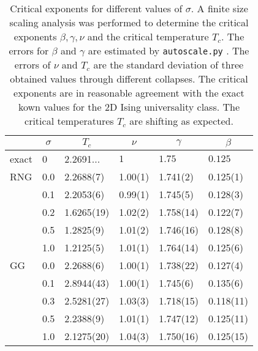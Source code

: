 \begin{table}[htb]
    \begin{ruledtabular}
        \begin{tabular}{l l l l l l}
             & \multicolumn{1}{c}{\(\sigma\)} & \multicolumn{1}{c}{\(T_c\)} & \multicolumn{1}{c}{\(\nu\)} & \multicolumn{1}{c}{\(\gamma\)} & \multicolumn{1}{c}{\(\beta\)}\\
            \hline
            exact        & 0   & 2.2691... & \(1\)    & \(1.75\) & \(0.125\)\\
            \hline
            RNG          & 0.0 & 2.2688(7) & 1.00(1) & 1.741(2) & 0.125(1) \\
                         & 0.1 & 2.2053(6) & 0.99(1) & 1.745(5) & 0.128(3) \\
                         & 0.2 & 1.6265(19)& 1.02(2) & 1.758(14)& 0.122(7)\\
                         & 0.5 & 1.2825(9) & 1.01(2) & 1.746(16)& 0.128(8)\\
                         & 1.0 & 1.2125(5) & 1.01(1) & 1.764(14)& 0.125(6)\\
            \hline
            GG           & 0.0 & 2.2688(6) & 1.00(1) & 1.738(22)& 0.127(4)\\
                         & 0.1 & 2.8944(43)& 1.00(1) & 1.745(6) & 0.135(6) \\
                         & 0.3 & 2.5281(27)& 1.03(3) & 1.718(15)& 0.118(11)\\
                         & 0.5 & 2.2388(9) & 1.01(1) & 1.747(12)& 0.125(11)\\
                         & 1.0 & 2.1275(20)& 1.04(3) & 1.750(16)& 0.125(15)\\
        \end{tabular}
    \end{ruledtabular}
    \caption[Critical Exponents for Different $\sigma$]{
        Critical exponents for different values of \(\sigma\). A finite size
        scaling analysis was performed to determine the critical
        exponents \(\beta, \gamma, \nu\) and the critical temperature
        \(T_c\). The errors for \(\beta\) and \(\gamma\) are estimated
        by \texttt{autoscale.py} \cite{autoscale2009}. The errors of
        \(\nu\) and \(T_c\) are the standard deviation of three obtained
        values through different collapses. The critical exponents
        are in reasonable agreement with the exact kown values for the 2D Ising
        universality class. The critical temperatures $T_c$ are shifting
        as expected.
    }
    \label{tab:critExp}
\end{table}
